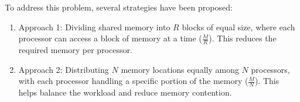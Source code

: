 \documentclass[a4paper, 10pt]{book}
\begin{document}
                    To address this problem, several strategies have been proposed:

                    \begin{enumerate}
                        
                        \item {\bold Approach 1:} Dividing shared memory into $R$ blocks of equal size, where each processor can access a block of memory at a time ($\frac{M}{R}$). This reduces the required memory per processor.

                        \item {\bold Approach 2:} Distributing $N$ memory locations equally among $N$ processors, with each processor handling a specific portion of the memory ($\frac{M}{N}$). This helps balance the workload and reduce memory contention.

                    \end{enumerate}
\end{document}
